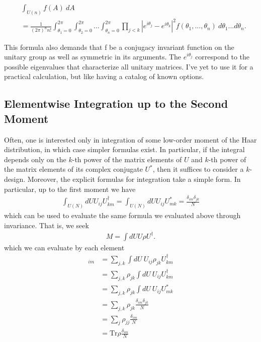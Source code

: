 \documentclass[11pt, oneside]{article}   	%
\begin{document}
\begin{align*} 
&\int_{U(n)} f(A) \ dA \\ 
&= \frac{1}{(2 \pi)^n n!} \int_{\theta_1=0}^{2 \pi} \int_{\theta_2=0}^{2 \pi} \ldots \int_{\theta_n=0}^{2 \pi} \prod_{j<k} |e^{i \theta_j} - e^{i \theta_k}|^2 f(\theta_1, ..., \theta_n) \ d \theta_1 ...d \theta_n. 
\end{align*}

This formula also demands that f be a conjugacy invariant function on the unitary group as well as symmetric in its arguments.  
The $e^{i\theta_j}$ correspond to the possible eigenvalues that characterize all unitary matrices.  
I’ve yet to use it for a practical calculation, but like having a catalog of known options.

\subsection{Elementwise Integration up to the Second Moment}
Often, one is interested only in integration of some low-order moment of the Haar distribution, in which case simpler formulas exist.  
In particular, if the integral depends only on the $k$-th power of the matrix elements of $U$ and $k$-th power of the matrix elements of its complex conjugate $U^*$, then it suffices to consider a $k$-design.  
Moreover, the explicit formulas for integration take a simple form.  
In particular, up to the first moment we have
\begin{align*}
 \int_{U(N)} dU U_{ij} U^\dagger_{km} = \int_{U(N)} dU U_{ij} U^*_{mk} = \frac{\delta_{im} \delta_{jk}}{N} 
 \end{align*}
which can be used to evaluate the same formula we evaluated above through invariance.  
That is, we seek
\begin{align*} 
M = \int dU U \rho U^\dagger. 
\end{align*}
which we can evaluate by each element
\begin{align*} 
[M]_{im} 
&= \sum_{j,k} \int dU \ U_{ij} \rho_{jk} U_{km}^\dagger \\ 
&= \sum_{j,k} \rho_{jk} \int dU \ U_{ij} U_{km}^\dagger \\ 
&= \sum_{j,k} \rho_{jk} \int dU \ U_{ij} U^*_{mk} \\ 
&= \sum_{j,k} \rho_{jk} \frac{\delta_{im} \delta_{jk}}{N} \\ 
&= \sum_{j} \rho_{jj} \frac{\delta_{im}}{N} \\ 
&= \mathrm{Tr} \rho \frac{\delta_{im}}{N}
\end{align*}
\end{document}
